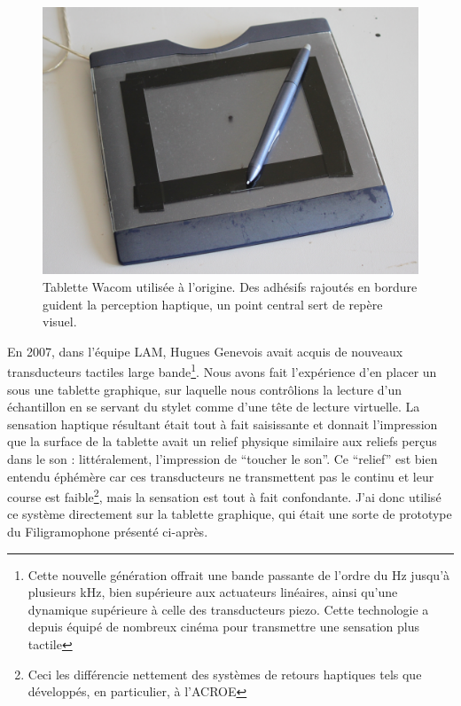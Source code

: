 \begin{figure}[!htbp]
	\captionsetup{format=plain}%
	\includegraphics[width=\textwidth]{gfx/05_interfaces/wacom.jpg}
	\caption[Tablette wacom]{Tablette Wacom utilisée à l'origine. Des adhésifs rajoutés en bordure guident la perception haptique, un point central sert de repère visuel.}
	\label{fig:interface:wacom}
\end{figure}
\indent En 2007, dans l'équipe \gls{LAM}, Hugues Genevois avait acquis de nouveaux transducteurs tactiles large bande\footnote{Cette nouvelle génération offrait une bande passante de l'ordre du Hz jusqu'à plusieurs kHz, bien supérieure aux actuateurs linéaires, ainsi qu'une dynamique supérieure à celle des transducteurs piezo. Cette technologie a depuis équipé de nombreux cinéma pour transmettre une sensation plus tactile}. Nous avons fait l'expérience d'en placer un sous une tablette graphique, sur laquelle nous contrôlions la lecture d'un échantillon en se servant du stylet comme d'une tête de lecture virtuelle. La sensation haptique résultant était tout à fait saisissante et donnait l'impression que la surface de la tablette avait un relief physique similaire aux reliefs perçus dans le son : littéralement, l'impression de ``toucher le son''. Ce ``relief'' est bien entendu éphémère car ces transducteurs ne transmettent pas le continu et leur course est faible\footnote{Ceci les différencie nettement des systèmes de retours haptiques tels que développés, en particulier, à l'\gls{ACROE}}, mais la sensation est tout à fait confondante. J'ai donc utilisé ce système directement sur la tablette graphique, qui était une sorte de prototype du Filigramophone présenté ci-après.

